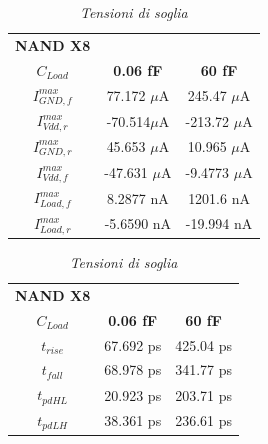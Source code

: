 \begin{table}[!h]\footnotesize
	\centering
	\begin{tabular}{|c|c|c|}
		\hline
\textbf{NAND X8} & &\\
\textbf{$C_{Load}$} & \textbf{0.06 fF} & \textbf{60 fF}\\
\hline
		$I_{GND, f}^{max}$ &77.172 $\mu$A &245.47 $\mu$A\\
		
		$I_{Vdd, r}^{max}$ &-70.514$\mu$A &-213.72 $\mu$A \\
		
		$I_{GND, r}^{max}$&45.653 $\mu$A &10.965 $\mu$A\\
		
		$I_{Vdd, f}^{max}$& -47.631 $\mu$A&-9.4773 $\mu$A \\
		
		$I_{Load, f}^{max}$ &8.2877 nA &1201.6 nA  \\
		
		$I_{Load, r}^{max}$ &-5.6590 nA &-19.994 nA  \\
		\hline
	\end{tabular}
	\caption{\textit{Tensioni di soglia}}
	\label{Tab5_8}
\end{table}
\begin{table}[!h]\footnotesize
	\centering
	\begin{tabular}{|c|c|c|}
		\hline
		\textbf{NAND X8} & &\\
		\textbf{$C_{Load}$} & \textbf{0.06 fF} & \textbf{60 fF}\\
		\hline
		$t_{rise}$ &67.692 ps &425.04 ps  \\
		
		$t_{fall}$ &68.978 ps &341.77 ps  \\
		
		$t_{pdHL}$&20.923 ps &203.71 ps  \\
		
		$t_{pdLH}$ &38.361 ps&236.61 ps  \\
		
		\hline
	\end{tabular}
	\caption{\textit{Tensioni di soglia}}
	\label{Tab5_9}
\end{table}
